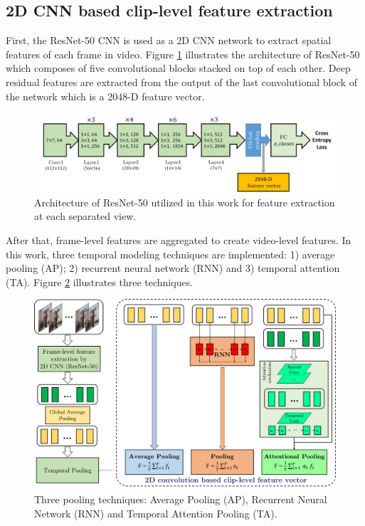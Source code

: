 
\subsection{2D CNN based clip-level feature extraction}
    First, the ResNet-50 CNN \cite{he2016deep} is used as a 2D CNN network to extract spatial features of each frame in video.
    Figure \ref{fig:resnet50} illustrates the architecture of ResNet-50 which composes of five convolutional blocks stacked on top of each other.
    Deep residual features are extracted from the output of the last convolutional block of the network which is a 2048-D feature vector.
    \begin{figure}[htbp]
        \centering
        \includegraphics[width=1\linewidth]{figs/Resnet50.png}
        \caption{Architecture of ResNet-50 utilized in this work for feature extraction at each separated view.}
        \label{fig:resnet50}
    \end{figure}
    After that, frame-level features are aggregated to create video-level features.
    In this work, three temporal modeling techniques are implemented: 1) average pooling (AP); 2) recurrent neural network (RNN) and 3) temporal attention (TA).
    Figure \ref{fig:pooling} illustrates three techniques.
    \begin{figure}[htbp]
        \centering
        \includegraphics[width=1\linewidth]{figs/Pooling.png}
        \caption{Three pooling techniques: Average Pooling (AP), Recurrent Neural Network (RNN) and Temporal Attention Pooling (TA).}
        \label{fig:pooling}
    \end{figure}

